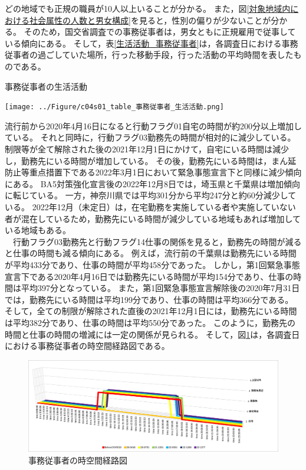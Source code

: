 \documentclass[paper={210mm,297mm},line_length=35zw,number_of_lines=31,head_space=30mm,gutter=40mm,baselineskip=2.0zw,headfoot_verticalposition=1.5zw]{jlreq}
\begin{document}
どの地域でも正規の職員が10人以上いることが分かる。
また，図\ref{対象地域内における社会属性の人数と男女構成}を見ると，性別の偏りが少ないことが分かる。
そのため，国交省調査での事務従事者は，男女ともに正規雇用で従事している傾向にある。
そして，表\ref{生活活動_事務従事者}は，各調査日における事務従事者の過ごしていた場所，行った移動手段，行った活動の平均時間を表したものである。\\

\begin{table}[H]
  \centering
  \caption{事務従事者の生活活動}
  \texttt{[image: ../Figure/c04s01\_table\_事務従事者\_生活活動.png]}
  \label{生活活動_事務従事者}
\end{table}

流行前から2020年4月16日になると行動フラグ01自宅の時間が約200分以上増加している。
それと同時に，行動フラグ03勤務先の時間が相対的に減少している。
制限等が全て解除された後の2021年12月1日にかけて，自宅にいる時間は減少し，勤務先にいる時間が増加している。
その後，勤務先にいる時間は，まん延防止等重点措置下である2022年3月1日において緊急事態宣言下と同様に減少傾向にある。
BA5対策強化宣言後の2022年12月8日では，埼玉県と千葉県は増加傾向に転じている。
一方，神奈川県では平均301分から平均247分と約60分減少している。
2022年12月（未定日）は，在宅勤務を実施している者や実施していない者が混在しているため，勤務先にいる時間が減少している地域もあれば増加している地域もある。\\
　行動フラグ03勤務先と行動フラグ14仕事の関係を見ると，勤務先の時間が減ると仕事の時間も減る傾向にある。
例えば，流行前の千葉県は勤務先にいる時間が平均433分であり、仕事の時間が平均458分であった。
しかし，第1回緊急事態宣言下である2020年4月16日では勤務先にいる時間が平均154分であり、仕事の時間は平均397分となっている。
また，第1回緊急事態宣言解除後の2020年7月31日では，勤務先にいる時間は平均199分であり、仕事の時間は平均366分である。
そして，全ての制限が解除された直後の2021年12月1日には，勤務先にいる時間は平均382分であり、仕事の時間は平均550分であった。
このように，勤務先の時間と仕事の時間の増減には一定の関係が見られる。
そして，図\ref{時空間経路図_事務従事者}は，各調査日における事務従事者の時空間経路図である。\\

\begin{figure}[H]
  \centering
  \includegraphics[scale=0.4]{../Figure/c04s01_fig_事務従事者_時空間経路図.png}
  \caption{事務従事者の時空間経路図}
  \label{時空間経路図_事務従事者}
\end{figure}
\end{document}
